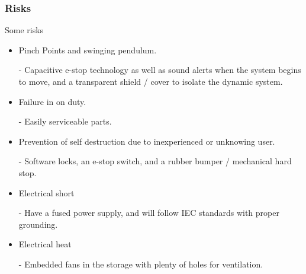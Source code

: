 \documentclass[aspectratio=169]{beamer}
\begin{document}
\begin{frame}
    \frametitle{Risks}

    Some risks

    \begin{itemize}
        \item Pinch Points and swinging pendulum.
        \item [-] Capacitive e-stop technology as well as sound alerts when the system begins to move, and a transparent shield / cover to isolate the dynamic system.
        \item Failure in on duty.
        \item [-] Easily serviceable parts.
        \item Prevention of self destruction due to inexperienced or unknowing user.
        \item [-] Software locks, an e-stop switch, and a rubber bumper / mechanical hard stop.
        \item Electrical short
        \item [-] Have a fused power supply, and will follow IEC standards with proper grounding.
        \item Electrical heat
        \item [-] Embedded fans in the storage with plenty of holes for ventilation. 
    \end{itemize}

\end{frame}
\end{document}
